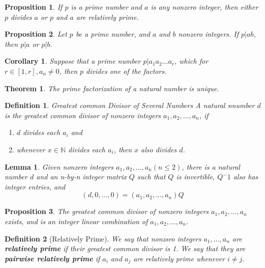 \documentclass[12pt]{article}
\newtheorem{definition}{Definition}[subsection]
\newtheorem{theorem}{Theorem}[subsection]
\newtheorem{proposition}{Proposition}[subsection]
\newtheorem{lemma}{Lemma}[subsection]
\newtheorem{corollary}{Corollary}[subsection]
\begin{document}
    \begin{proposition}
        If $p$ is a prime number and $a$ is any nonzero integer, then either $p$ divides $a$ or $p$ and $a$ are relatively prime.
    \end{proposition}
    
    \begin{proposition}
        Let $p$ be a prime number, and $a$ and $b$ nonzero integers. If $p|ab$, then $p|a$ or $p|b$. 
    \end{proposition}
    
    \begin{corollary}
        Suppose that a prime number $p|a_1a_2...a_r$, which for $r \in [1, r], a_n \neq 0$, then $p$ divides one of the factors.
    \end{corollary}
    
    \begin{theorem}
        The prime factorization of a natural number is unique.
    \end{theorem}
    \begin{definition}{Greatest common Divisor of Several Numbers}
        A natural nnumber $d$ is the greatest common divisor of nonzero integers $a_1, a_2, ..., a_n$, if
        \begin{enumerate}
            \item $d$ divides each $a_i$ and
            \item whenever $x \in \mathbb{N}$ divides each $a_i$, then $x$ also divides $d$.
        \end{enumerate}
    \end{definition}
    
    \begin{lemma}
        Given nonzero integers $a_1, a_2, ..., a_n(n \leq 2)$, there is a natural number $d$ and an n-by-n integer matrix $Q$ such that $Q$ is invertible, $Q^-1$ also has integer entries, and
        \begin{equation}
            (d, 0, ..., 0) = (a_1, a_2, ..., a_n)Q
        \end{equation}
    \end{lemma}

    \begin{proposition}
        The greatest common divisor of nonzero integers $a_1, a_2,...,a_n$ exists, and is an integer linear combination of $a_1, a_2, ..., a_n$.
    \end{proposition} 
    \begin{definition}[Relatively Prime]
        We say that nonzsro integers $a_1,...,a_n$ are \textbf{relatively prime} if their greatest common divisor is 1. We say that they are \textbf{pairwise relatively prime} if $a_i$ and $a_j$ are relatively prime whenever $i \neq j$.
    \end{definition}
\end{document}
